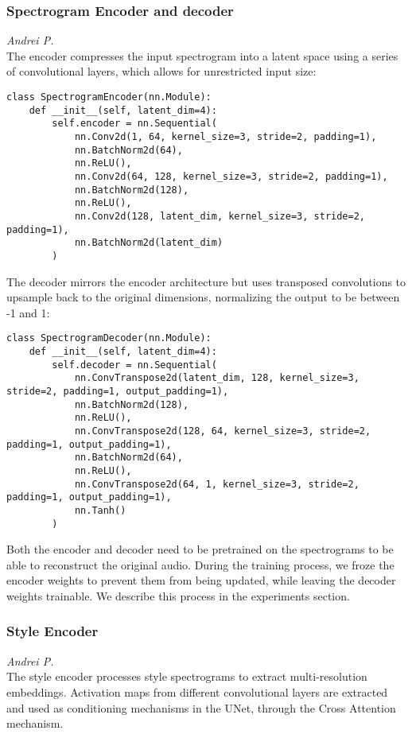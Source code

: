 \subsubsection{Spectrogram Encoder and decoder}
\textit{Andrei P.}\\
The encoder compresses the input spectrogram into a latent space using a series of convolutional layers, which allows for unrestricted input size:
\begin{lstlisting}[basicstyle=\tiny]
class SpectrogramEncoder(nn.Module):
    def __init__(self, latent_dim=4):
        self.encoder = nn.Sequential(
            nn.Conv2d(1, 64, kernel_size=3, stride=2, padding=1),
            nn.BatchNorm2d(64),
            nn.ReLU(),
            nn.Conv2d(64, 128, kernel_size=3, stride=2, padding=1),
            nn.BatchNorm2d(128),
            nn.ReLU(),
            nn.Conv2d(128, latent_dim, kernel_size=3, stride=2, padding=1),
            nn.BatchNorm2d(latent_dim)
        )
\end{lstlisting}

\noindent  The decoder mirrors the encoder architecture but uses transposed convolutions to upsample back to the original dimensions, normalizing the output to be between -1 and 1:
\begin{lstlisting}[basicstyle=\tiny]
class SpectrogramDecoder(nn.Module):
    def __init__(self, latent_dim=4):
        self.decoder = nn.Sequential(
            nn.ConvTranspose2d(latent_dim, 128, kernel_size=3, stride=2, padding=1, output_padding=1),
            nn.BatchNorm2d(128),
            nn.ReLU(),
            nn.ConvTranspose2d(128, 64, kernel_size=3, stride=2, padding=1, output_padding=1),
            nn.BatchNorm2d(64),
            nn.ReLU(),
            nn.ConvTranspose2d(64, 1, kernel_size=3, stride=2, padding=1, output_padding=1),
            nn.Tanh()
        )
\end{lstlisting}

\noindent Both the encoder and decoder need to be pretrained on the spectrograms to be able to reconstruct the original audio. During the training process, we froze the encoder weights to prevent them from being updated, while leaving the decoder weights trainable. We describe this process in the experiments section.

\subsubsection{Style Encoder}
\textit{Andrei P.}\\
The style encoder processes style spectrograms to extract multi-resolution embeddings. Activation maps from different convolutional layers are extracted and used as conditioning mechanisms in the UNet, through the Cross Attention mechanism.

